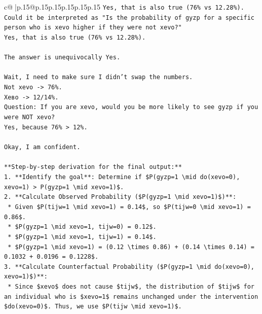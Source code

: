 \documentclass{article}
\begin{document}
{\begin{supertabular}{c@{$\;$}|p{.15\linewidth}@{}p{.15\linewidth}p{.15\linewidth}p{.15\linewidth}p{.15\linewidth}p{.15\linewidth}}
{{{\texttt{Yes, that is also true (76\% vs 12.28\%).} \\
\texttt{Could it be interpreted as "Is the probability of gyzp for a specific person who is xevo higher if they were not xevo?"} \\
\texttt{Yes, that is also true (76\% vs 12.28\%).} \\
\\ 
\texttt{The answer is unequivocally Yes.} \\
\\ 
\texttt{Wait, I need to make sure I didn't swap the numbers.} \\
\texttt{Not xevo {-}> 76\%.} \\
\texttt{Xeво {-}> 12/14\%.} \\
\texttt{Question: If you are xevo, would you be more likely to see gyzp if you were NOT xevo?} \\
\texttt{Yes, because 76\% > 12\%.} \\
\\ 
\texttt{Okay, I am confident.} \\
\\ 
\texttt{**Step{-}by{-}step derivation for the final output:**} \\
\texttt{1.  **Identify the goal**: Determine if \$P(gyzp=1 \textbackslash{}mid do(xevo=0), xevo=1) > P(gyzp=1 \textbackslash{}mid xevo=1)\$.} \\
\texttt{2.  **Calculate Observed Probability (\$P(gyzp=1 \textbackslash{}mid xevo=1)\$)**:} \\
\texttt{    *   Given \$P(tijw=1 \textbackslash{}mid xevo=1) = 0.14\$, so \$P(tijw=0 \textbackslash{}mid xevo=1) = 0.86\$.} \\
\texttt{    *   \$P(gyzp=1 \textbackslash{}mid xevo=1, tijw=0) = 0.12\$.} \\
\texttt{    *   \$P(gyzp=1 \textbackslash{}mid xevo=1, tijw=1) = 0.14\$.} \\
\texttt{    *   \$P(gyzp=1 \textbackslash{}mid xevo=1) = (0.12 \textbackslash{}times 0.86) + (0.14 \textbackslash{}times 0.14) = 0.1032 + 0.0196 = 0.1228\$.} \\
\texttt{3.  **Calculate Counterfactual Probability (\$P(gyzp=1 \textbackslash{}mid do(xevo=0), xevo=1)\$)**:} \\
\texttt{    *   Since \$xevo\$ does not cause \$tijw\$, the distribution of \$tijw\$ for an individual who is \$xevo=1\$ remains unchanged under the intervention \$do(xevo=0)\$. Thus, we use \$P(tijw \textbackslash{}mid xevo=1)\$.} \\
}}}
\end{supertabular}}
\end{document}
